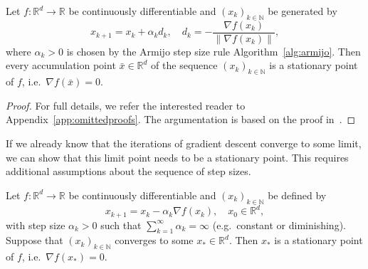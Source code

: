 \documentclass[12pt,openany]{book}
\theoremstyle{definition}
\theoremstyle{definition}
\newcommand{\N}{\mathbb{N}}
\newcommand{\R}{\mathbb{R}}
\begin{document}
\begin{thm}\label{thm:armijo}
Let $f:\R^d\to\R$ be continuously differentiable and $(x_k)_{k\in\N}$ be generated by
\[x_{k+1} = x_k + \alpha_k d_k,\quad d_k = -\frac{\nabla f(x_k)}{\|\nabla f(x_k)\|},\]
where $\alpha_k>0$ is chosen by the Armijo step size rule Algorithm~\ref{alg:armijo}. Then every accumulation point $\bar x\in\R^d$ of the sequence $(x_k)_{k\in\N}$ is a stationary point of $f$, i.e.~$\nabla f(\bar x)=0$.
\end{thm}
\begin{proof}
For full details, we refer the interested reader to Appendix~\ref{app:omittedproofs}. The argumentation
is based on the proof in~\cite{DPB15}.
\end{proof}

If we already know that the iterations of gradient descent converge to some limit, we can show that this limit point needs to be a stationary point. This requires additional assumptions about the sequence of step sizes. 
\begin{thm}
Let $f:\R^d\to\R$ be continuously differentiable and $(x_k)_{k\in\N}$ be defined by
\[ x_{k+1} = x_k - \alpha_k \nabla f(x_k), \quad x_0\in\R^d,\]
with step size $\alpha_k>0$ such that $\sum_{k=1}^\infty \alpha_k=\infty$ (e.g.~constant or diminishing). Suppose that $(x_k)_{k\in\N}$ converges to some $x_\ast\in\R^d$. Then $x_\ast$ is a stationary point of $f$, i.e.~$\nabla f(x_\ast)= 0$.
\end{thm}
\end{document}
